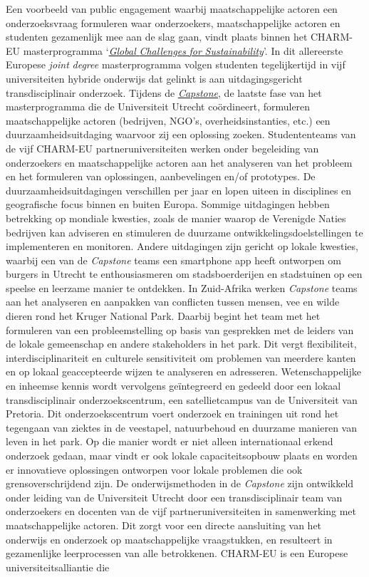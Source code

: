 \documentclass[empirical, authordate, ]{new-jote-article}
\begin{document}
	\begin{bookboxnotitle}
		Een voorbeeld van public engagement waarbij maatschappelijke actoren een onderzoeksvraag formuleren waar onderzoekers, maatschappelijke actoren en studenten gezamenlijk mee aan de slag gaan, vindt plaats binnen het CHARM-EU masterprogramma ‘\href{https://www.charm-eu.eu/masters/globalchallenges}{\emph{Global }\emph{Challenges}\emph{ }\emph{for}\emph{ }\emph{Sustainability}}'. In dit allereerste Europese \emph{joint }\emph{degree} masterprogramma volgen studenten tegelijkertijd in vijf universiteiten hybride onderwijs dat gelinkt is aan uitdagingsgericht transdisciplinair onderzoek. Tijdens de \href{https://www.charm-eu.eu/capstonephase}{\emph{Capstone}}, de laatste fase van het masterprogramma die de Universiteit Utrecht coördineert, formuleren maatschappelijke actoren (bedrijven, NGO's, overheidsinstanties, etc.) een duurzaamheidsuitdaging waarvoor zij een oplossing zoeken. Studententeams van de vijf CHARM-EU partneruniversiteiten werken onder begeleiding van onderzoekers en maatschappelijke actoren aan het analyseren van het probleem en het formuleren van oplossingen, aanbevelingen en/of prototypes. De duurzaamheidsuitdagingen verschillen per jaar en lopen uiteen in disciplines en geografische focus binnen en buiten Europa. Sommige uitdagingen hebben betrekking op mondiale kwesties, zoals de manier waarop de Verenigde Naties bedrijven kan adviseren en stimuleren de duurzame ontwikkelingsdoelstellingen te implementeren en monitoren. Andere uitdagingen zijn gericht op lokale kwesties, waarbij een van de \emph{Capstone} teams een smartphone app heeft ontworpen om burgers in Utrecht te enthousiasmeren om stadsboerderijen en stadstuinen op een speelse en leerzame manier te ontdekken. In Zuid-Afrika werken \emph{Capstone} teams aan het analyseren en aanpakken van conflicten tussen mensen, vee en wilde dieren rond het Kruger National Park. Daarbij begint het team met het formuleren van een probleemstelling op basis van gesprekken met de leiders van de lokale gemeenschap en andere stakeholders in het park. Dit vergt flexibiliteit, interdisciplinariteit en culturele sensitiviteit om problemen van meerdere kanten en op lokaal geaccepteerde wijzen te analyseren en adresseren. Wetenschappelijke en inheemse kennis wordt vervolgens geïntegreerd en gedeeld door een lokaal transdisciplinair onderzoekscentrum, een satellietcampus van de Universiteit van Pretoria. Dit onderzoekscentrum voert onderzoek en trainingen uit rond het tegengaan van ziektes in de veestapel, natuurbehoud en duurzame manieren van leven in het park. Op die manier wordt er niet alleen internationaal erkend onderzoek gedaan, maar vindt er ook lokale capaciteitsopbouw plaats en worden er innovatieve oplossingen ontworpen voor lokale problemen die ook grensoverschrijdend zijn. De onderwijsmethoden in de \emph{Capstone} zijn ontwikkeld onder leiding van de Universiteit Utrecht door een transdisciplinair team van onderzoekers en docenten van de vijf partneruniversiteiten in samenwerking met maatschappelijke actoren. Dit zorgt voor een directe aansluiting van het onderwijs en onderzoek op maatschappelijke vraagstukken, en resulteert in gezamenlijke leerprocessen van alle betrokkenen. CHARM-EU is een Europese universiteitsalliantie die 
\end{bookboxnotitle}
\end{document}
